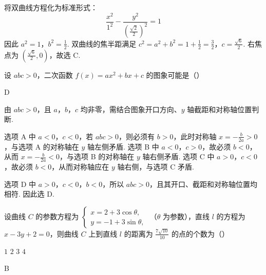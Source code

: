 \begin{solution}
将双曲线方程化为标准形式：
\[
\frac{x^2}{1^2}-\frac{y^2}{\left(\frac{\sqrt{2}}{2}\right)^2}=1
\]
因此 \(a^2=1\)，\(b^2=\frac{1}{2}\). 双曲线的焦半距满足
\(c^2=a^2+b^2=1+\frac{1}{2}=\frac{3}{2}\)，\(c=\frac{\sqrt{6}}{2}\).
右焦点为 \(\left(\frac{\sqrt{6}}{2},0\right)\)，故选 C.
\end{solution}

\begin{problem}
设 \( abc > 0 \)，二次函数 \( f(x) = ax^2 + bx + c \) 的图象可能是（\quad）

    {}
    {}
    {}
\end{problem}

\begin{answer}
D
\end{answer}

\begin{solution}
由 \(abc>0\)，且 \(a\)，\(b\)，\(c\) 均非零，需结合图象开口方向、\(y\) 轴截距和对称轴位置判断.

选项 A 中 \(a<0\)，\(c<0\)，若 \(abc>0\)，则必须有 \(b>0\)，此时对称轴
\(x=-\frac{b}{2a}>0\)，与选项 A 的对称轴在 \(y\) 轴左侧矛盾. 选项 B 中 \(a<0\)，\(c>0\)，故必须 \(b<0\)，从而 \(x=-\frac{b}{2a}<0\)，与选项 B 的对称轴在 \(y\) 轴右侧矛盾. 选项 C 中 \(a>0\)，\(c<0\)，故必须 \(b<0\)，从而对称轴应在 \(y\) 轴右侧，与选项 C 矛盾.

选项 D 中 \(a>0\)，\(c<0\)，\(b<0\)，所以 \(abc>0\)，且其开口、截距和对称轴位置均相符. 因此选 D.
\end{solution}

\begin{problem}
设曲线 \(C\) 的参数方程为 \(\begin{cases}
x = 2 + 3\cos \theta,\\
y = -1 + 3\sin \theta,
\end{cases}\) （\(\theta\) 为参数），直线 \(l\) 的方程为 \(x - 3y + 2 = 0\)，则曲线 \(C\) 上到直线 \(l\) 的距离为 \(\frac{7\sqrt{10}}{10}\) 的点的个数为（\quad）

\choices
    {\(1\)}
    {\(2\)}
    {\(3\)}
    {\(4\)}
\end{problem}

\begin{answer}
B
\end{answer}

